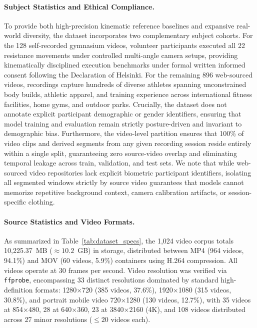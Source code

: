 \documentclass[runningheads]{llncs}
\begin{document}
\paragraph{Subject Statistics and Ethical Compliance.} To provide both high-precision kinematic reference baselines and expansive real-world diversity, the dataset incorporates two complementary subject cohorts. For the 128 self-recorded gymnasium videos, volunteer participants executed all 22 resistance movements under controlled multi-angle camera setups, providing kinematically disciplined execution benchmarks under formal written informed consent following the Declaration of Helsinki. For the remaining 896 web-sourced videos, recordings capture hundreds of diverse athletes spanning unconstrained body builds, athletic apparel, and training experience across international fitness facilities, home gyms, and outdoor parks. Crucially, the dataset does not annotate explicit participant demographic or gender identifiers, ensuring that model training and evaluation remain strictly posture-driven and invariant to demographic bias. Furthermore, the video-level partition ensures that 100\% of video clips and derived segments from any given recording session reside entirely within a single split, guaranteeing zero source-video overlap and eliminating temporal leakage across train, validation, and test sets. We note that while web-sourced video repositories lack explicit biometric participant identifiers, isolating all segmented windows strictly by source video guarantees that models cannot memorize repetitive background context, camera calibration artifacts, or session-specific clothing.

\paragraph{Source Statistics and Video Formats.} As summarized in Table~\ref{tab:dataset_specs}, the 1,024 video corpus totals 10,225.37~MB ($\approx 10.2$~GB) in storage, distributed between MP4 (964 videos, 94.1\%) and MOV (60 videos, 5.9\%) containers using H.264 compression. All videos operate at 30 frames per second. Video resolution was verified via \texttt{ffprobe}, encompassing 33 distinct resolutions dominated by standard high-definition formats: 1280$\times$720 (385 videos, 37.6\%), 1920$\times$1080 (315 videos, 30.8\%), and portrait mobile video 720$\times$1280 (130 videos, 12.7\%), with 35 videos at 854$\times$480, 28 at 640$\times$360, 23 at 3840$\times$2160 (4K), and 108 videos distributed across 27 minor resolutions ($\le 20$ videos each).
\end{document}
